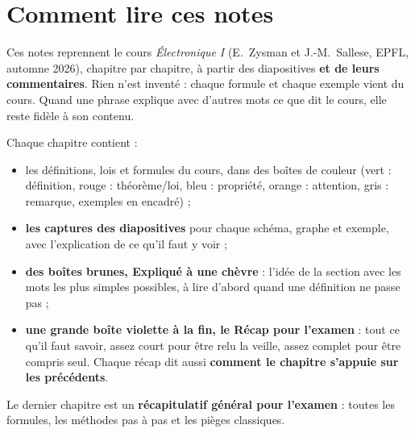 \documentclass[11pt,a4paper,openany]{book}
\begin{document}
\raggedbottom


\tableofcontents
\clearpage

\chapter*{Comment lire ces notes}

Ces notes reprennent le cours \emph{Électronique I} (E.~Zysman et J.-M.~Sallese, EPFL,
automne 2026), chapitre par chapitre, à partir des diapositives \textbf{et de leurs
commentaires}. Rien n'est inventé : chaque formule et chaque exemple vient du cours. Quand
une phrase explique avec d'autres mots ce que dit le cours, elle reste fidèle à son contenu.

Chaque chapitre contient :
\begin{itemize}
  \item les définitions, lois et formules du cours, dans des boîtes de couleur
        (vert : définition, rouge : théorème/loi, bleu : propriété, orange : attention,
        gris : remarque, exemples en encadré) ;
  \item \textbf{les captures des diapositives} pour chaque schéma, graphe et exemple, avec
        l'explication de ce qu'il faut y voir ;
  \item \textbf{des boîtes brunes, \og Expliqué à une chèvre\fg{}} : l'idée de la section
        avec les mots les plus simples possibles, à lire d'abord quand une définition ne
        passe pas ;
  \item \textbf{une grande boîte violette à la fin, le \og Récap pour l'examen\fg{}} : tout ce
        qu'il faut savoir, assez court pour être relu la veille, assez complet pour être
        compris seul. Chaque récap dit aussi \textbf{comment le chapitre s'appuie sur les
        précédents}.
\end{itemize}
Le dernier chapitre est un \textbf{récapitulatif général pour l'examen} : toutes les
formules, les méthodes pas à pas et les pièges classiques.










\end{document}
